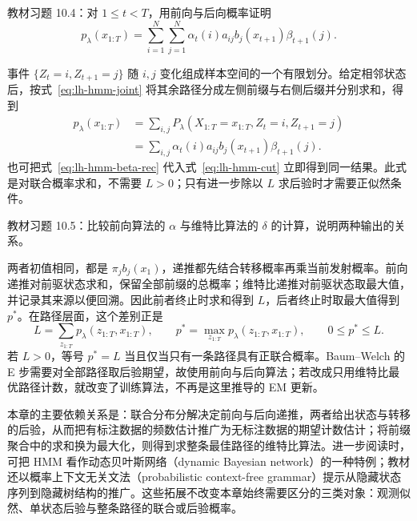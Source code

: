 \begin{example}
\label{ex:lh-hmm-ex-two-cut}
教材习题 10.4：对 $1\leq t<T$，用前向与后向概率证明
\[
 p_\lambda(x_{1:T})=\sum_{i=1}^N\sum_{j=1}^N
 \alpha_t(i)a_{ij}b_j(x_{t+1})\beta_{t+1}(j).
\]
\end{example}
\begin{solve}
事件 $\{Z_t=i,Z_{t+1}=j\}$ 随 $i,j$ 变化组成样本空间的一个有限划分。给定相邻状态后，按式~\eqref{eq:lh-hmm-joint} 将其余路径分成左侧前缀与右侧后缀并分别求和，得到
\[
 \begin{aligned}
 p_\lambda(x_{1:T})
 &=\sum_{i,j}P_\lambda(X_{1:T}=x_{1:T},Z_t=i,Z_{t+1}=j)\\
 &=\sum_{i,j}\alpha_t(i)a_{ij}b_j(x_{t+1})\beta_{t+1}(j).
 \end{aligned}
\]
也可把式~\eqref{eq:lh-hmm-beta-rec} 代入式~\eqref{eq:lh-hmm-cut} 立即得到同一结果。此式是对联合概率求和，不需要 $L>0$；只有进一步除以 $L$ 求后验时才需要正似然条件。
\end{solve}

\begin{example}
\label{ex:lh-hmm-ex-sum-max}
教材习题 10.5：比较前向算法的 $\alpha$ 与维特比算法的 $\delta$ 的计算，说明两种输出的关系。
\end{example}
\begin{solve}
两者初值相同，都是 $\pi_jb_j(x_1)$，递推都先结合转移概率再乘当前发射概率。前向递推对前驱状态求和，保留全部前缀的总概率；维特比递推对前驱状态取最大值，并记录其来源以便回溯。因此前者终止时求和得到 $L$，后者终止时取最大值得到 $p^*$。在路径层面，这个差别正是
\[
 L=\sum_{z_{1:T}}p_\lambda(z_{1:T},x_{1:T}),\qquad
 p^*=\max_{z_{1:T}}p_\lambda(z_{1:T},x_{1:T}),\qquad 0\leq p^*\leq L.
\]
若 $L>0$，等号 $p^*=L$ 当且仅当只有一条路径具有正联合概率。Baum--Welch 的 E 步需要对全部路径取后验期望，故使用前向与后向算法；若改成只用维特比最优路径计数，就改变了训练算法，不再是这里推导的 EM 更新。
\end{solve}

本章的主要依赖关系是：联合分布分解决定前向与后向递推，两者给出状态与转移的后验，从而把有标注数据的频数估计推广为无标注数据的期望计数估计；将前缀聚合中的求和换为最大化，则得到求整条最佳路径的维特比算法。进一步阅读时，可把 HMM 看作动态贝叶斯网络（dynamic Bayesian network）的一种特例；教材还以概率上下文无关文法（probabilistic context-free grammar）提示从隐藏状态序列到隐藏树结构的推广。这些拓展不改变本章始终需要区分的三类对象：观测似然、单状态后验与整条路径的联合或后验概率。








